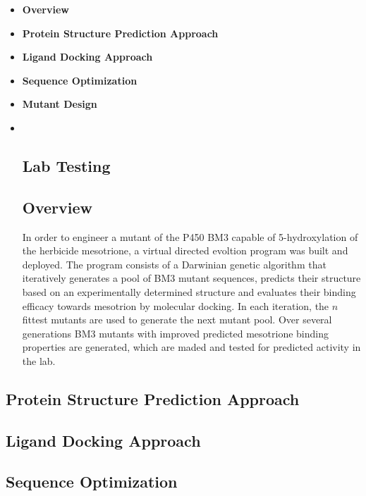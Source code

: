 \begin{itemize}
\item
  \textbf{Overview}
\item
  \textbf{Protein Structure Prediction Approach}
\item
  \textbf{Ligand Docking Approach}
\item
  \textbf{Sequence Optimization}
\item
  \textbf{Mutant Design}
\item ~
  \hypertarget{lab-testing}{%
  \subsection{\texorpdfstring{\textbf{Lab
  Testing}}{Lab Testing}}\label{lab-testing}}

  \hypertarget{overview-5}{%
  \subsection{Overview}\label{overview-5}}

  In order to engineer a mutant of the P450 BM3 capable of
  5-hydroxylation of the herbicide mesotrione, a virtual directed
  evoltion program was built and deployed. The program consists of a
  Darwinian genetic algorithm that iteratively generates a pool of BM3
  mutant sequences, predicts their structure based on an experimentally
  determined structure and evaluates their binding efficacy towards
  mesotrion by molecular docking. In each iteration, the \(n\) fittest
  mutants are used to generate the next mutant pool. Over several
  generations BM3 mutants with improved predicted mesotrione binding
  properties are generated, which are maded and tested for predicted
  activity in the lab.
\end{itemize}

\hypertarget{protein-structure-prediction-approach}{%
\subsection{Protein Structure Prediction
Approach}\label{protein-structure-prediction-approach}}

\hypertarget{ligand-docking-approach}{%
\subsection{Ligand Docking Approach}\label{ligand-docking-approach}}

\hypertarget{sequence-optimization-1}{%
\subsection{Sequence Optimization}\label{sequence-optimization-1}}

